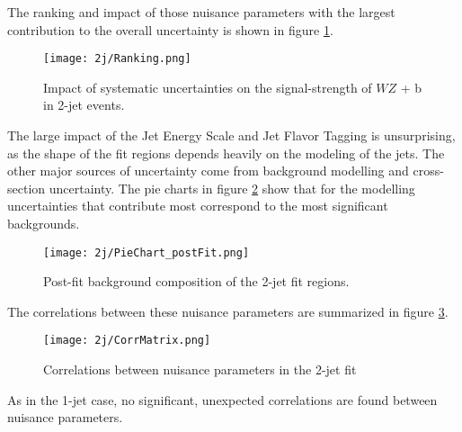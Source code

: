 The ranking and impact of those nuisance parameters with the largest contribution to the overall uncertainty is shown in figure \ref{fig:ranking_2j}.

\begin{figure}[H]
    \centering
    \texttt{[image: 2j/Ranking.png]}
    \caption{Impact of systematic uncertainties on the signal-strength of $WZ$ + b in 2-jet events.}
    \label{fig:ranking_2j}
\end{figure}

The large impact of the Jet Energy Scale and Jet Flavor Tagging is unsurprising, as the shape of the fit regions depends heavily on the modeling of the jets. The other major sources of uncertainty come from background modelling and cross-section uncertainty. The pie charts in figure \ref{fig:pie_chart_2j} show that for the modelling uncertainties that contribute most correspond to the most significant backgrounds. %

\begin{figure}[H]
    \centering
    \texttt{[image: 2j/PieChart\_postFit.png]}
    \caption{Post-fit background composition of the 2-jet fit regions.}
    \label{fig:pie_chart_2j}
\end{figure}

The correlations between these nuisance parameters are summarized in figure \ref{fig:corr_mat_2j}. 

\begin{figure}[H]
    \centering
    \texttt{[image: 2j/CorrMatrix.png]}
    \caption{Correlations between nuisance parameters in the 2-jet fit}
    \label{fig:corr_mat_2j}
\end{figure}

As in the 1-jet case, no significant, unexpected correlations are found between nuisance parameters.



